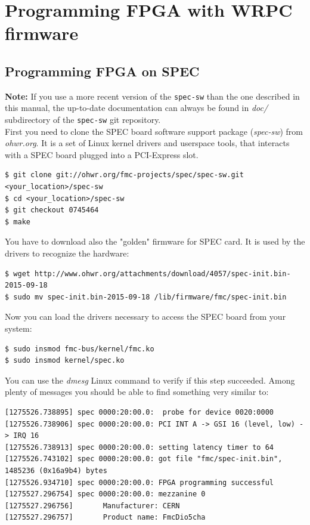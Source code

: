 \documentclass[a4paper, 12pt]{article}
\renewcommand{\_}{\underscore\allowbreak}
\begin{document}
\newpage
\section{Programming FPGA with WRPC firmware}
\label{Programming FPGA}

\subsection{Programming FPGA on SPEC}
\label{Programming FPGA on SPEC}

\textbf{Note:} If you use a more recent version of the \texttt{spec-sw} than the
one described in this manual, the up-to-date documentation can always be found
in \textit{doc/} subdirectory of the \texttt{spec-sw} git repository.\\

First you need to clone the SPEC board software support package
(\textit{spec-sw}) from \textit{ohwr.org}. It is a set of Linux kernel drivers and
userspace tools, that interacts with a SPEC board plugged into a PCI-Express
slot.\\

\begin{lstlisting}
$ git clone git://ohwr.org/fmc-projects/spec/spec-sw.git <your_location>/spec-sw
$ cd <your_location>/spec-sw
$ git checkout 0745464
$ make
\end{lstlisting}

You have to download also the "golden" firmware for SPEC card. It is used by
the drivers to recognize the hardware:
\begin{lstlisting}
$ wget http://www.ohwr.org/attachments/download/4057/spec-init.bin-2015-09-18
$ sudo mv spec-init.bin-2015-09-18 /lib/firmware/fmc/spec-init.bin
\end{lstlisting}

Now you can load the drivers necessary to access the SPEC board from your
system:
\begin{lstlisting}
$ sudo insmod fmc-bus/kernel/fmc.ko
$ sudo insmod kernel/spec.ko
\end{lstlisting}

You can use the \textit{dmesg} Linux command to verify if this step succeeded.
Among plenty of messages you should be able to find something very similar to:
\begin{lstlisting}[basicstyle=\scriptsize\ttfamily]
[1275526.738895] spec 0000:20:00.0:  probe for device 0020:0000
[1275526.738906] spec 0000:20:00.0: PCI INT A -> GSI 16 (level, low) -> IRQ 16
[1275526.738913] spec 0000:20:00.0: setting latency timer to 64
[1275526.743102] spec 0000:20:00.0: got file "fmc/spec-init.bin", 1485236 (0x16a9b4) bytes
[1275526.934710] spec 0000:20:00.0: FPGA programming successful
[1275527.296754] spec 0000:20:00.0: mezzanine 0
[1275527.296756]       Manufacturer: CERN
[1275527.296757]       Product name: FmcDio5cha
\end{lstlisting}
\end{document}
